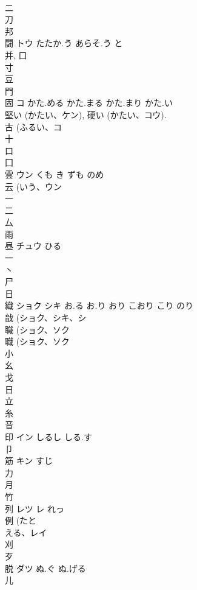 \documentclass[8pt]{extreport}
\begin{document}
\begin{CJK}{UTF8}{min}
\\	二 
\\	刀 
\\	邦 
\\	闘	トウ	たたか.う あらそ.う と	
\\	并, 口 
\\	寸 
\\	豆 
\\	門 
\\	固	コ	かた.める かた.まる かた.まり かた.い	
\\	堅い (かたい、ケン), 硬い (かたい、コウ). 
\\	古 (ふるい、コ 
\\	十 
\\	口 
\\	囗 
\\	雲	ウン	くも き ずも のめ	
\\	云 (いう、ウン 
\\	一 
\\	二 
\\	厶 
\\	雨 
\\	昼	チュウ	ひる	
\\	一 
\\	丶 
\\	尸 
\\	日 
\\	織	ショク シキ	お.る お.り おり こおり こり のり	
\\	戠 (ショク、シキ、シ 
\\	職 (ショク、ソク 
\\	職 (ショク、ソク 
\\	小 
\\	幺 
\\	戈 
\\	日 
\\	立 
\\	糸 
\\	音 
\\	印	イン	しるし しる.す	
\\	卩 
\\	筋	キン	すじ	
\\	力 
\\	月 
\\	竹 
\\	列	レツ レ	れっ	
\\	例 (たと
\\	える、レイ 
\\	刈 
\\	歹 
\\	脱	ダツ	ぬ.ぐ ぬ.げる	
\\	儿 

\end{CJK}
\end{document}
